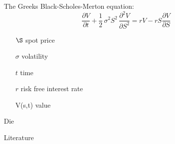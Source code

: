 \documentclass[t,dvipsnames]{beamer}
\begin{document}
\begin{frame}{The Greeks}
    Black-Scholes-Merton equation:
        \begin{equation}
            \frac{\partial V}{\partial t}
            +
            \frac{1}{2}\, \sigma^2 S^2  \,
            \frac{\partial^2V}{\partial S^2}
            =
            rV
            -
            rS\frac{\partial V}{\partial S}
        \end{equation}
        \hspace{20ex}
        \parbox{\textwidth}{
            \begin{itemize}
                \item[$\S$] spot price
                \item[$\sigma$]  volatility
                \item[$t$] time
                \item[$r$] risk free interest rate
                \item[V(s,t)] value
            \end{itemize}
            }
\end{frame}


\begin{frame}{Die }
\end{frame}

\begin{frame}[allowframebreaks]{Literature}
    \printbibliography
\end{frame}
\end{document}
